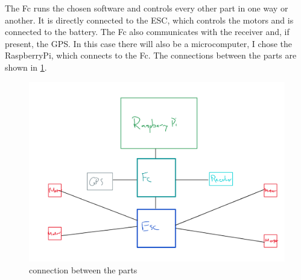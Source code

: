 \documentclass[svgnames]{article}
\begin{document}
	The \gls{Fc} runs the chosen software and controls every other part in one way or another. It is directly connected to the \gls{ESC}, which controls the motors and is connected to the battery. The \gls{Fc} also communicates with the receiver and, if present, the \gls{GPS}. In this case there will also be a microcomputer, I chose the RaspberryPi, which connects to the \gls{Fc}. The connections between the parts are shown in \cref{fig:cheappartconnection}.
	\begin{figure}
		\centering
		\includegraphics[width=0.7\linewidth]{pictures/cheappartconnection}
		\caption{connection between the parts}
		\label{fig:cheappartconnection}
	\end{figure} 
	

	
\end{document}
